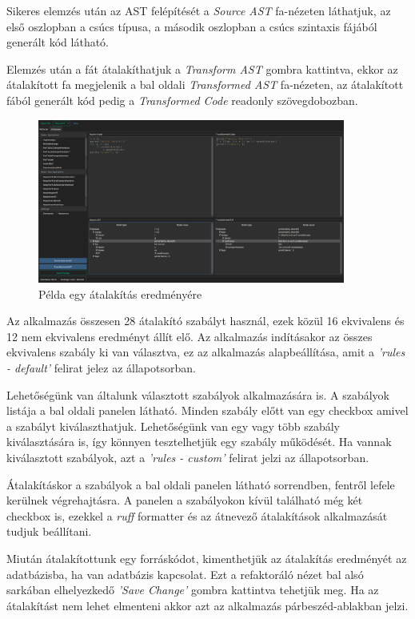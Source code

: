Sikeres elemzés után az AST felépítését a \emph{Source AST} fa-nézeten láthatjuk, 
az első oszlopban a csúcs típusa, a második oszlopban a csúcs szintaxis fájából generált kód látható. 

Elemzés után a fát átalakíthatjuk a \emph{Transform AST} gombra kattintva, 
ekkor az átalakított fa megjelenik a bal oldali \emph{Transformed AST} fa-nézeten,
az átalakított fából generált kód pedig a \emph{Transformed Code} readonly szövegdobozban.

\begin{figure}[H]
	\centering
	\includegraphics[width=0.9\textwidth]{images/screenshots/refactor_tab_2.png}
	\caption{Példa egy átalakítás eredményére}
\end{figure}

Az alkalmazás összesen 28 átalakító szabályt használ, ezek közül 16 ekvivalens és 12 nem ekvivalens
eredményt állít elő.
Az alkalmazás indításakor az összes ekvivalens szabály ki van választva,
ez az alkalmazás alapbeállítása, amit a \emph{'rules - default'} felirat jelez az állapotsorban.

Lehetőségünk van általunk választott szabályok alkalmazására is.
A szabályok listája a bal oldali panelen látható. Minden szabály előtt van egy checkbox
amivel a szabályt kiválaszthatjuk. Lehetőségünk van egy vagy több szabály kiválasztására is,
így könnyen tesztelhetjük egy szabály működését.
Ha vannak kiválasztott szabályok, azt a \emph{'rules - custom'} felirat jelzi az állapotsorban.

Átalakításkor a szabályok a bal oldali panelen látható sorrendben, fentről lefele kerülnek végrehajtásra.
A panelen a szabályokon kívül található még két checkbox is,
ezekkel a \emph{ruff} formatter és az átnevező átalakítások alkalmazását tudjuk beállítani.

Miután átalakítottunk egy forráskódot, kimenthetjük az átalakítás eredményét az adatbázisba,
ha van adatbázis kapcsolat.
Ezt a refaktoráló nézet bal alsó sarkában elhelyezkedő \emph{'Save Change'} gombra kattintva
tehetjük meg.
Ha az átalakítást nem lehet elmenteni akkor azt az alkalmazás párbeszéd-ablakban jelzi.

